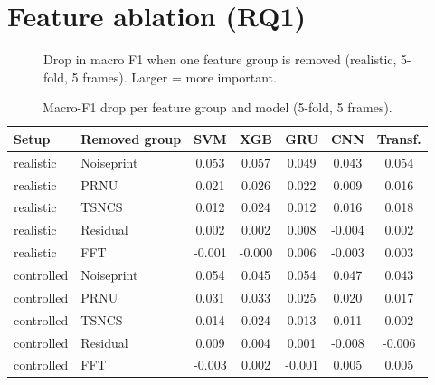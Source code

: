 \documentclass[11pt,a4paper]{article}
\begin{document}
\section{Feature ablation (RQ1)}
\begin{figure}[H]\centering{}\caption{Drop in macro F1 when one feature group is removed (realistic, 5-fold, 5 frames). Larger = more important.}\label{fig:ablation}\end{figure}
\begin{table}[H]\centering\small\caption{Macro-F1 drop per feature group and model (5-fold, 5 frames).}\begin{tabular}{llccccc}\toprule Setup & Removed group & SVM & XGB & GRU & CNN & Transf. \\\midrule
realistic & Noiseprint & 0.053 & 0.057 & 0.049 & 0.043 & 0.054 \\
realistic & PRNU & 0.021 & 0.026 & 0.022 & 0.009 & 0.016 \\
realistic & TSNCS & 0.012 & 0.024 & 0.012 & 0.016 & 0.018 \\
realistic & Residual & 0.002 & 0.002 & 0.008 & -0.004 & 0.002 \\
realistic & FFT & -0.001 & -0.000 & 0.006 & -0.003 & 0.003 \\
controlled & Noiseprint & 0.054 & 0.045 & 0.054 & 0.047 & 0.043 \\
controlled & PRNU & 0.031 & 0.033 & 0.025 & 0.020 & 0.017 \\
controlled & TSNCS & 0.014 & 0.024 & 0.013 & 0.011 & 0.002 \\
controlled & Residual & 0.009 & 0.004 & 0.001 & -0.008 & -0.006 \\
controlled & FFT & -0.003 & 0.002 & -0.001 & 0.005 & 0.005 \\
\bottomrule\end{tabular}\end{table}
\end{document}
